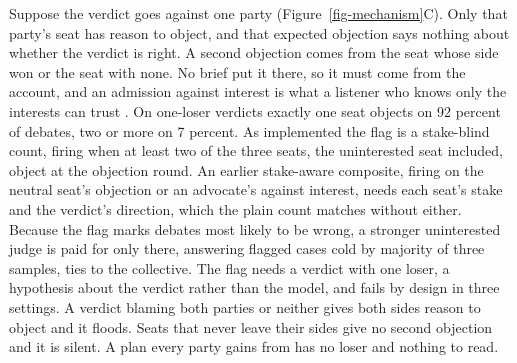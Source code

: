 Suppose the verdict goes against one party (Figure~\ref{fig-mechanism}C).
Only that party's seat has reason to object, and that expected objection
says nothing about whether the verdict is right. A second objection comes
from the seat whose side won or the seat with none. No brief put it there,
so it must come from the account, and an admission against interest is
what a listener who knows only the interests can trust
\citep{milgrom1986relying,lipman1995robust}. %
On one-loser verdicts exactly one seat objects on 92 percent of debates,
two or more on 7
percent. %
As implemented the flag is a stake-blind count, firing when at least two
of the three seats, the uninterested seat included, object at the
objection round. %
An earlier stake-aware composite, firing on the neutral seat's objection
or an advocate's against interest, needs each seat's stake and the
verdict's direction, which the plain count matches without
either. %
Because the flag marks debates most likely to be wrong, a stronger
uninterested judge is paid for only there, answering flagged cases cold
by majority of three samples, ties to the
collective. %
The flag needs a verdict with one loser, a hypothesis about the verdict
rather than the model, and fails by design in three settings. A verdict
blaming both parties or neither gives both sides reason to object and it
floods. Seats that never leave their sides give no second objection and
it is silent. A plan every party gains from has no loser and nothing to
read. %

